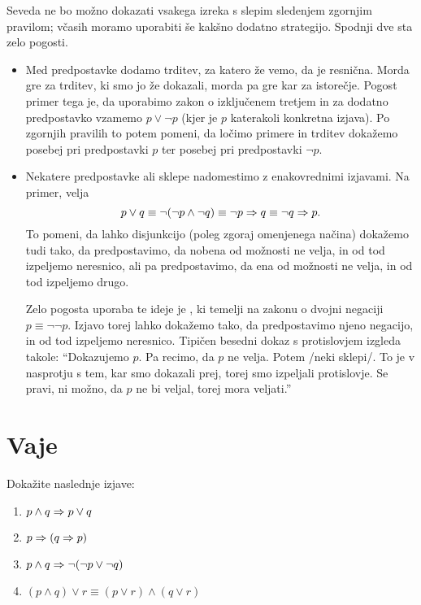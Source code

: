         Seveda ne bo možno dokazati vsakega izreka s slepim sledenjem zgornjim pravilom; včasih moramo uporabiti še kakšno dodatno strategijo. Spodnji dve sta zelo pogosti.
        \begin{itemize}
                \item
                        Med predpostavke dodamo trditev, za katero že vemo, da je resnična. Morda gre za trditev, ki smo jo že dokazali, morda pa gre kar za istorečje. Pogost primer tega je, da uporabimo zakon o izključenem tretjem in za dodatno predpostavko vzamemo $p \lor \lnot{p}$ (kjer je $p$ katerakoli konkretna izjava). Po zgornjih pravilih to potem pomeni, da ločimo primere in trditev dokažemo posebej pri predpostavki $p$ ter posebej pri predpostavki $\lnot{p}$.
                \item
                        Nekatere predpostavke ali sklepe nadomestimo z enakovrednimi izjavami. Na primer, velja
                        \[p \lor q \equiv \lnot(\lnot{p} \land \lnot{q}) \equiv \lnot{p} \Rightarrow q \equiv \lnot{q} \Rightarrow p.\]
                        To pomeni, da lahko disjunkcijo (poleg zgoraj omenjenega načina) dokažemo tudi tako, da predpostavimo, da nobena od možnosti ne velja, in od tod izpeljemo neresnico, ali pa predpostavimo, da ena od možnosti ne velja, in od tod izpeljemo drugo.

                        Zelo pogosta uporaba te ideje je , ki temelji na zakonu o dvojni negaciji $p \equiv \lnot\lnot{p}$. Izjavo torej lahko dokažemo tako, da predpostavimo njeno negacijo, in od tod izpeljemo neresnico. Tipičen besedni dokaz s protislovjem izgleda takole: ``Dokazujemo $p$. Pa recimo, da $p$ ne velja. Potem /neki sklepi/. To je v nasprotju s tem, kar smo dokazali prej, torej smo izpeljali protislovje. Se pravi, ni možno, da $p$ ne bi veljal, torej mora veljati.''
        \end{itemize}



\section{Vaje}


\begin{vaja}
  Dokažite naslednje izjave:
  \begin{enumerate}
  \item $p \land q \Rightarrow p \lor q$
  \item $p \Rightarrow (q \Rightarrow p)$
  \item $p \land q \Rightarrow \lnot (\lnot p \lor \lnot q)$
  \item $(p \land q) \lor r \equiv (p \lor r) \land (q \lor r)$
  \end{enumerate}
\end{vaja}

